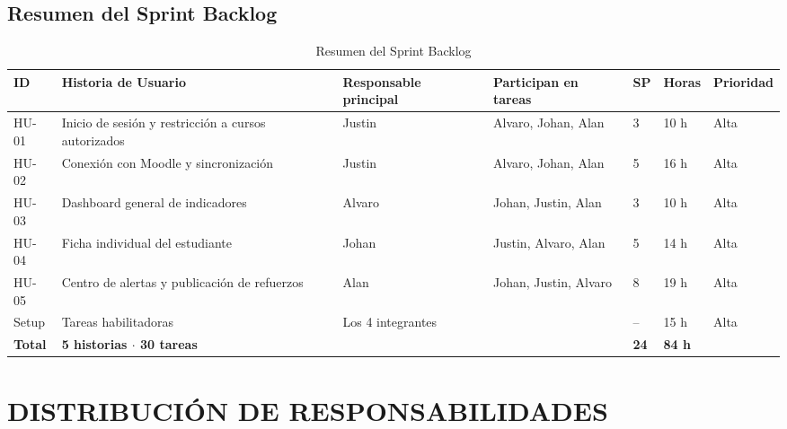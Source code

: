 \documentclass[11pt,a4paper]{article}
\newcommand{\hd}[1]{\textbf{#1}}
\begin{document}
\subsection{Resumen del Sprint Backlog}
\begin{table}[H]
\centering\small
\caption{Resumen del Sprint Backlog}
\begin{tabularx}{\textwidth}{|R{1.3cm}|Y|R{2.0cm}|R{3.2cm}|R{0.8cm}|R{1.2cm}|R{1.4cm}|}
\hline
\hd{ID} & \hd{Historia de Usuario} & \hd{Responsable principal} & \hd{Participan en tareas} & \hd{SP} & \hd{Horas} & \hd{Prioridad}\\ \hline
HU-01 & Inicio de sesión y restricción a cursos autorizados & Justin & Alvaro, Johan, Alan & 3 & 10 h & Alta\\ \hline
HU-02 & Conexión con Moodle y sincronización & Justin & Alvaro, Johan, Alan & 5 & 16 h & Alta\\ \hline
HU-03 & Dashboard general de indicadores & Alvaro & Johan, Justin, Alan & 3 & 10 h & Alta\\ \hline
HU-04 & Ficha individual del estudiante & Johan & Justin, Alvaro, Alan & 5 & 14 h & Alta\\ \hline
HU-05 & Centro de alertas y publicación de refuerzos & Alan & Johan, Justin, Alvaro & 8 & 19 h & Alta\\ \hline
Setup & Tareas habilitadoras & Los 4 integrantes & & -- & 15 h & Alta\\ \hline
\textbf{Total} & \textbf{5 historias $\cdot$ 30 tareas} & & & \textbf{24} & \textbf{84 h} & \\ \hline
\end{tabularx}
\end{table}

\section{DISTRIBUCIÓN DE RESPONSABILIDADES}
\end{document}
